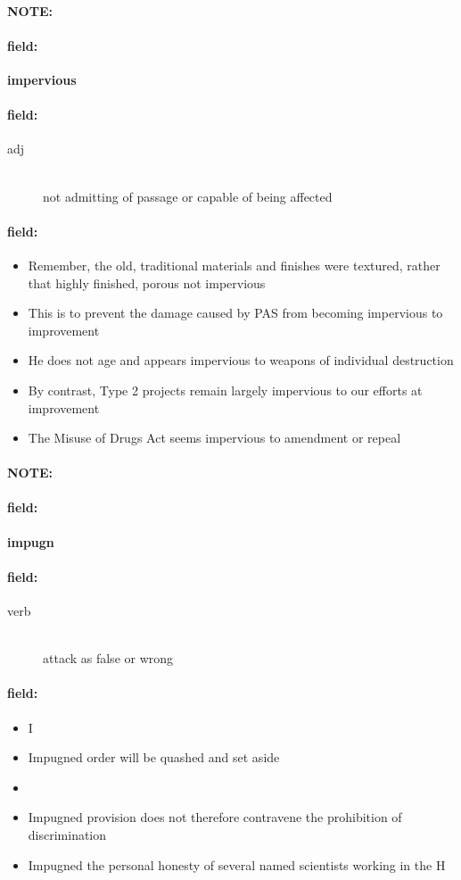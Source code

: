 \documentclass[12pt]{article}
\newenvironment{note}{\paragraph{NOTE:}}{}
\newenvironment{field}{\paragraph{field:}}{}
\begin{document}
\begin{note}
\begin{field}
\textbf{\large impervious}
\end{field}


\begin{field}
\begin{description}
\item[adj] \hfill \\ 
not admitting of passage or capable of being affected

\end{description}
\end{field}

\begin{field}
\begin{itemize}
\item Remember, the old, traditional materials and finishes were textured, rather that highly finished, porous not impervious
\item This is to prevent the damage caused by PAS from becoming impervious to improvement
\item He does not age and appears impervious to weapons of individual destruction
\item By contrast, Type 2 projects remain largely impervious to our efforts at improvement
\item The Misuse of Drugs Act seems impervious to amendment or repeal
\end{itemize}
\end{field}
\end{note}
\begin{note}
\begin{field}
\textbf{\large impugn}
\end{field}


\begin{field}
\begin{description}
\item[verb] \hfill \\ 
attack as false or wrong

\end{description}
\end{field}

\begin{field}
\begin{itemize}
\item I
\item Impugned order will be quashed and set aside
\item 
\item Impugned provision does not therefore contravene the prohibition of discrimination
\item Impugned the personal honesty of several named scientists working in the H
\end{itemize}
\end{field}
\end{note}
\end{document}
